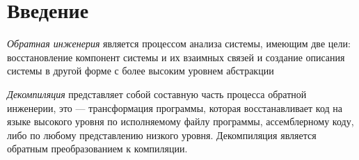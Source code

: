 \documentclass[a4paper,12pt,russian]{article}
\begin{document}

\tableofcontents

\newpage

\section*{Введение}
\emph{Обратная инженерия} является процессом анализа системы, имеющим две цели: восстановление компонент системы и их взаимных связей и создание описания системы в другой форме с более высоким уровнем абстракции

\emph{Декомпиляция} представляет собой составную часть процесса обратной инженерии, это --- трансформация программы, которая восстанавливает код на языке высокого уровня по исполняемому файлу программы, ассемблерному коду, либо по любому представлению низкого уровня.
Декомпиляция является обратным преобразованием к компиляции.
\end{document}
